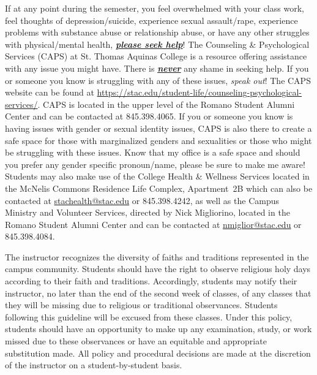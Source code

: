 \documentclass[11pt,letterpaper]{article}
\begin{document}
If at any point during the semester, you feel overwhelmed with your class work, feel thoughts of depression/suicide, experience sexual assault/rape, experience problems with substance abuse or relationship abuse, or have any other struggles with physical/mental health, \underline{\bfseries\itshape please seek help}! The Counseling \& Psychological Services (CAPS) at St. Thomas Aquinas College is a resource offering assistance with any issue you might have. There is \underline{\bfseries\itshape never} any shame in seeking help. If you or someone you know is struggling with any of these issues, {\itshape speak out}! The CAPS website can be found at \href{https://stac.edu/student-life/counseling-psychological-services/}{https://stac.edu/student-life/counseling-psychological-services/}. CAPS is located in the upper level of the Romano Student Alumni Center and can be contacted at 845.398.4065. If you or someone you know is having issues with gender or sexual identity issues, CAPS is also there to create a safe space for those with marginalized genders and sexualities or those who might be struggling with these issues. Know that my office is a safe space and should you prefer any gender specific pronoun/name, please be sure to make me aware! Students may also make use of the College Health \& Wellness Services located in the McNelis Commons Residence Life Complex, Apartment~2B which can also be contacted at \href{mailto:stachealth@stac.edu}{stachealth@stac.edu} or 845.398.4242, as well as the Campus Ministry and Volunteer Services, directed by Nick Migliorino, located in the Romano Student Alumni Center and can be contacted at \href{mailto:nmiglior@stac.edu}{nmiglior@stac.edu} or 845.398.4084.
\sectionbreak



The instructor recognizes the diversity of faiths and traditions represented in the campus community. Students should have the right to observe religious holy days according to their faith and traditions. Accordingly, students may notify their instructor, no later than the end of the second week of classes, of any classes that they will be missing due to religious or traditional observances. Students following this guideline will be excused from these classes. Under this policy, students should have an opportunity to make up any examination, study, or work missed due to these observances or have an equitable and appropriate substitution made. All policy and procedural decisions are made at the discretion of the instructor on a student-by-student basis. 
\sectionbreak
\end{document}

